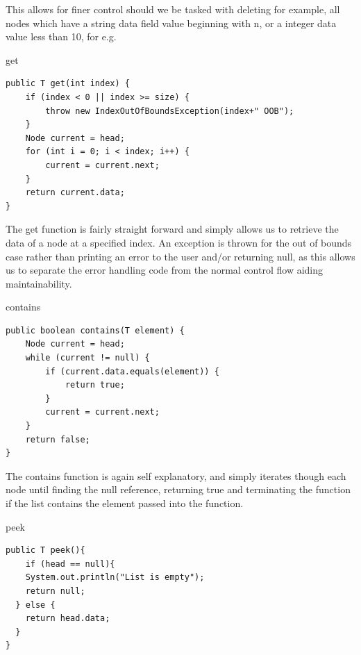 \documentclass[a4paper]{article}
\begin{document}
This allows for finer control should we be tasked with deleting 
for example, all nodes which have a string data field value 
beginning with n, or a integer data value less than 10, for e.g.




\begin{algorithm}
\caption{get}\label{euclid}

\begin{verbatim}
public T get(int index) {
    if (index < 0 || index >= size) {
        throw new IndexOutOfBoundsException(index+" OOB");
    }
    Node current = head;
    for (int i = 0; i < index; i++) {
        current = current.next;
    }
    return current.data;
}
\end{verbatim}

\end{algorithm}

The get function is fairly straight forward and simply allows 
us to retrieve the data of a node at a specified index.
An exception is thrown for the out of bounds case rather than 
printing an error to the user and/or returning null, 
as this allows us to separate the error handling code 
from the normal control flow aiding maintainability.

\newpage
\begin{algorithm}
\caption{contains}\label{euclid}

\begin{verbatim}
public boolean contains(T element) {
    Node current = head;
    while (current != null) {
        if (current.data.equals(element)) {
            return true;
        }
        current = current.next;
    }
    return false;
}
\end{verbatim}

\end{algorithm}

The contains function is again self explanatory, and simply
iterates though each node until finding the null reference, 
returning true and terminating the function if the list contains
the element passed into the function. \\



\begin{algorithm}
\caption{peek}\label{euclid}

\begin{verbatim}
public T peek(){
    if (head == null){
    System.out.println("List is empty");
    return null;
  } else {
    return head.data;
  }
}
\end{verbatim}

\end{algorithm}
\end{document}
